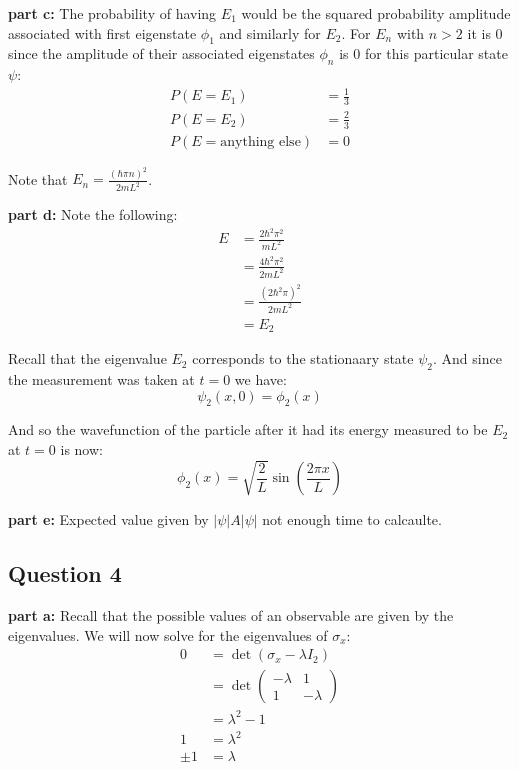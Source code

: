 \documentclass{article}
\begin{document}
\noindent\textbf{part c:} The probability of having $E_1$ would be the squared probability amplitude associated with first eigenstate $\phi_1$ and similarly for $E_2$. For $E_n$ with $n>2$ it is 0 since the amplitude of their associated eigenstates $\phi_n$ is 0 for this particular state $\psi$:
\begin{align*}
    P(E=E_1)&=\frac{1}{3}\\
    P(E=E_2)&=\frac{2}{3}\\
    P(E=\text{anything else})&=0
\end{align*}

Note that $E_n=\frac{(\hbar\pi n)^2}{2mL^2}$.
\bigskip

\noindent\textbf{part d:} Note the following:
\begin{align*}
    E&=\frac{2\hbar^2\pi^2}{mL^2}\\
    &=\frac{4\hbar^2\pi^2}{2mL^2}\\
    &=\frac{(2\hbar^2\pi)^2}{2mL^2}\\
    &=E_2
\end{align*}

Recall that the eigenvalue $E_2$ corresponds to the stationaary state $\psi_2$. And since the measurement was taken at $t=0$ we have:
$$\psi_2(x,0)=\phi_2(x)$$

And so the wavefunction of the particle after it had its energy measured to be $E_2$ at $t=0$ is now:
$$\phi_2(x)=\sqrt{\frac{2}{L}}\sin\left(\frac{2\pi x}{L}\right)$$
\bigskip

\noindent\textbf{part e:} Expected value given by $|\psi|A|\psi|$ not enough time to calcaulte.
\bigskip

\subsection*{Question 4}
\noindent\textbf{part a:} Recall that the possible values of an observable are given by the eigenvalues. We will now solve for the eigenvalues of $\sigma_x$:
\begin{align*}
    0&=\det(\sigma_x-\lambda I_2)\tag{characteristic equation}\\
    &=\det\begin{pmatrix}
        -\lambda&1\\1&-\lambda
    \end{pmatrix}\\
    &=\lambda^2-1\tag{det. of $2\times2$ matrix}\\
    1&=\lambda^2\\
    \pm1&=\lambda
\end{align*}
\end{document}
